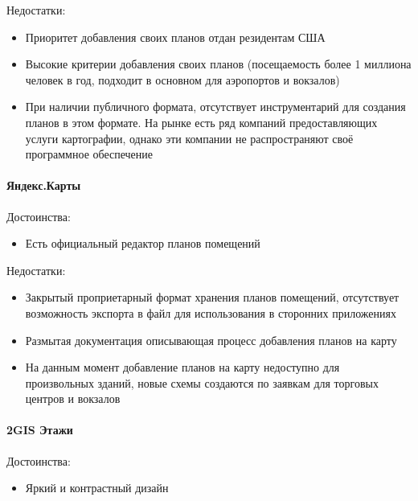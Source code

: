         \noindent Недостатки:
        \begin{itemize}
          \item Приоритет добавления своих планов отдан резидентам США
          \item Высокие критерии добавления своих планов (посещаемость более 1 миллиона человек в год, подходит в основном для аэропортов и вокзалов)
          \item При наличии публичного формата, отсутствует инструментарий для создания планов в этом формате. На рынке есть ряд компаний предоставляющих услуги картографии, однако эти компании не распространяют своё программное обеспечение
        \end{itemize}


      \paragraph{Яндекс.Карты}

        \noindent Достоинства:
        \begin{itemize}
          \item Есть официальный редактор планов помещений
        \end{itemize}

        \noindent Недостатки:
        \begin{itemize}
          \item Закрытый проприетарный формат хранения планов помещений, отсутствует возможность экспорта в файл для использования в сторонних приложениях
          \item Размытая документация описывающая процесс добавления планов на карту
          \item На данным момент добавление планов на карту недоступно для произвольных зданий, новые схемы создаются по заявкам для торговых центров и вокзалов
        \end{itemize}


      \paragraph{2GIS Этажи}

        \noindent Достоинства:
        \begin{itemize}
          \item Яркий и контрастный дизайн
        \end{itemize}

